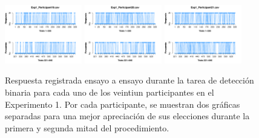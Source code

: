\begin{figure}[th]
\includegraphics[width=0.30\textwidth]{Figures/Response_Exp1_P19} \includegraphics[width=0.30\textwidth]{Figures/Response_Exp1_P20} \includegraphics[width=0.30\textwidth]{Figures/Response_Exp1_P21} 
\caption[Response_Exp1]{Respuesta registrada ensayo a ensayo durante la tarea de detección binaria para cada uno de los veintiun participantes en el Experimento 1. Por cada participante, se muestran dos gráficas separadas para una mejor apreciación de sus elecciones durante la primera y segunda mitad del procedimiento.}
\label{fig:Response_E1}
\end{figure}

